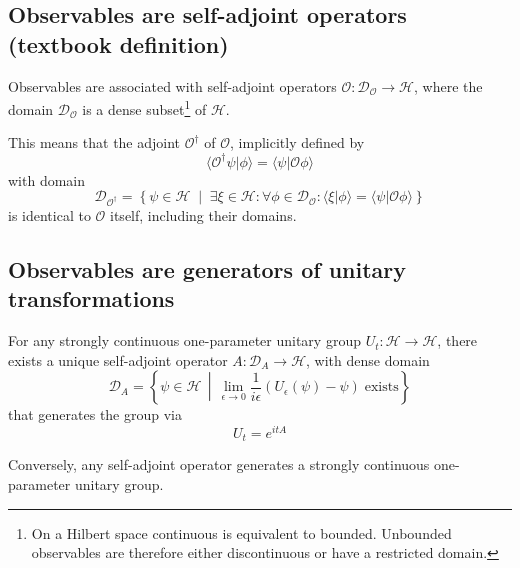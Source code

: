 \subsection{Observables are self-adjoint operators (textbook definition)}
\begin{defn}
	Observables are associated with self-adjoint operators $\mathcal{O} : \mathcal{D}_{\mathcal{O}} \to \mathcal{H}$, where the domain $\mathcal{D}_{\mathcal{O}}$ is a dense subset\footnote{On a Hilbert space continuous is equivalent to bounded. Unbounded observables are therefore either discontinuous or have a restricted domain.} of $\mathcal{H}$.

	This means that the adjoint $\mathcal{O}^{\dagger}$ of $\mathcal{O}$, implicitly defined by
	\begin{equation}\label{rp_qm_adjoint}
		\langle \mathcal{O}^{\dagger} \psi | \phi \rangle = \langle \psi | \mathcal{O} \phi \rangle
	\end{equation}
	with domain
	\begin{equation}\label{rp_qm_adjoint_dom}
		\mathcal{D}_{\mathcal{O}^{\dagger}} = \left\{ \psi \in \mathcal{H} \; \middle| \; \exists \xi \in \mathcal{H}: \forall \phi \in \mathcal{D}_{\mathcal{O}}: \langle \xi | \phi \rangle = \langle \psi | \mathcal{O} \phi \rangle \right\}
	\end{equation}
	is identical to $\mathcal{O}$ itself, including their domains.
\end{defn}


\subsection{Observables are generators of unitary transformations}
\begin{thrm}\label{th:stone}
	For any strongly continuous one-parameter unitary group $U_{t}: \mathcal{H} \to \mathcal{H}$, there exists a unique self-adjoint operator $A: \mathcal{D}_{A} \to \mathcal{H}$, with dense domain
	\begin{equation}
		\mathcal{D}_{A} = \left\{ \psi \in \mathcal{H} \, \middle| \, \lim_{\epsilon \to 0} \frac{ 1 }{ i \epsilon } ( U_{\epsilon} ( \psi ) - \psi ) \; \text{exists} \right\}
	\end{equation}
	that generates the group via
	\begin{equation}
		U_{t} = e^{itA}
	\end{equation}

	Conversely, any self-adjoint operator generates a strongly continuous one-parameter unitary group.
\end{thrm}

